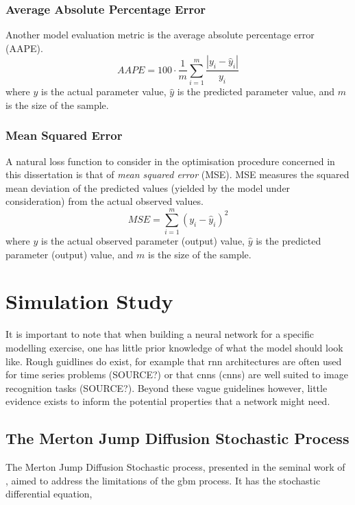 \documentclass[11pt,oneside,openany,a4paper,english, report, goldenblock
]{usthesis}
\begin{document}
\subsection{Average Absolute Percentage Error}
Another model evaluation metric is the average absolute percentage error (AAPE).
\begin{equation}
AAPE = 100 \cdot \frac{1}{m} \sum_{i=1}^{m} \frac{\left| y_i - \hat{y}_i \right|}{y_i}
\end{equation}
where $y$ is the actual parameter value, $\hat{y}$ is the predicted parameter value, and $m$ is the size of the sample.

\subsection{Mean Squared Error}
A natural loss function to consider in the optimisation procedure concerned in this dissertation is that of \textit{mean squared error} (MSE). MSE measures the squared mean deviation of the predicted values (yielded by the model under consideration) from the actual observed values.
\begin{equation}
MSE = \sum_{i=1}^{m}\left(y_i-\hat{y}_i\right)^2
\end{equation}
where $y$ is the actual observed parameter (output) value, $\hat{y}$ is the predicted parameter (output) value, and $m$ is the size of the sample.

\chapter{Simulation Study}
\label{chapter:simulation_study}

It is important to note that when building a neural network for a specific modelling exercise, one has little prior knowledge of what the model should look like. Rough guidlines do exist, for example that \acrfull{rnn} architectures are often used for time series problems (SOURCE?) or that \acrlong{cnn}s (\acrshort{cnn}s) are well suited to image recognition tasks (SOURCE?). Beyond these vague guidelines however, little evidence exists to inform the potential properties that a network might need.

\section{The Merton Jump Diffusion Stochastic Process}

The Merton Jump Diffusion Stochastic process, presented in the seminal work of \citet{Merton}, aimed to address the limitations of the \acrshort{gbm} process. It has the stochastic differential equation,
\end{document}
